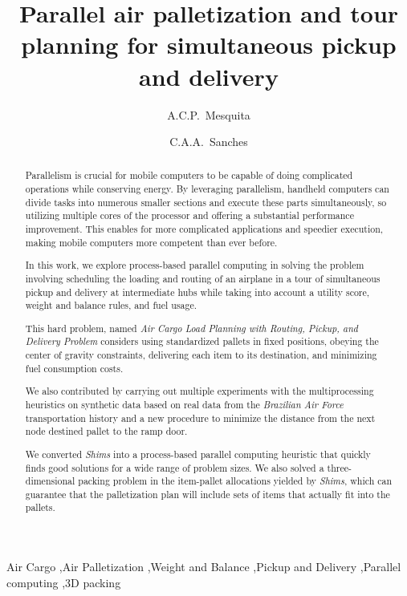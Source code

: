 \documentclass[preprint,authoryear]{elsarticle}
\begin{document}
\begin{frontmatter}

\title{Parallel air palletization and tour planning for simultaneous pickup and delivery}

\author{A.C.P.~Mesquita}

\author{C.A.A.~Sanches}

\address {Instituto Tecnol\'{o}gico de Aeron\'{a}utica - DCTA/ITA/IEC\\
Pra\c{c}a Mal. Eduardo Gomes, 50\\
S\~{a}o Jos\'{e} dos Campos - SP - 12.228-900 - Brazil}


\begin{abstract}

Parallelism is crucial for mobile computers to be capable of doing complicated operations while conserving energy. By leveraging parallelism, handheld computers can divide tasks into numerous smaller sections and execute these parts simultaneously, so utilizing multiple cores of the processor and offering a substantial performance improvement. This enables for more complicated applications and speedier execution, making mobile computers more competent than ever before.

In this work, we explore process-based parallel computing in solving the problem involving scheduling the loading and routing of an airplane in a tour of simultaneous pickup and delivery at intermediate hubs while taking into account a utility score, weight and balance rules, and fuel usage.

This hard problem, named {\it Air Cargo Load Planning with Routing, Pickup, and Delivery Problem} considers using standardized pallets in fixed positions, obeying the center of gravity constraints, delivering each item to its destination, and minimizing fuel consumption costs.

We also contributed by carrying out multiple experiments with the multiprocessing heuristics on synthetic data based on real data from the {\it Brazilian Air Force} transportation history and a new procedure to minimize the distance from the next node destined pallet to the ramp door.

We converted {\it Shims} into a process-based parallel computing heuristic that quickly finds good solutions for a wide range of problem sizes. We also solved a three-dimensional packing problem in the item-pallet allocations yielded by {\it Shims}, which can guarantee that the palletization plan will include sets of items that actually fit into the pallets.

\end{abstract}

\begin{keyword}
Air Cargo \sep Air Palletization \sep Weight and Balance \sep Pickup and Delivery \sep Parallel computing \sep 3D packing
\end{keyword}

\end{frontmatter}
\end{document}
